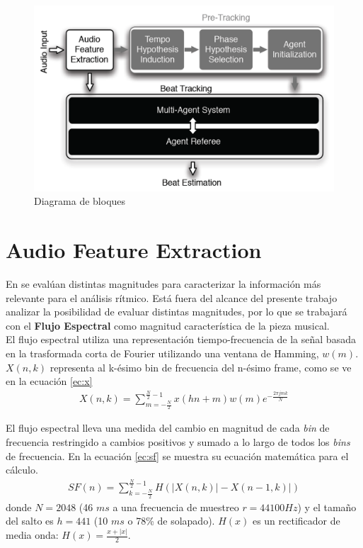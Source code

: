 \documentclass[12pt,a4paper,titlepage]{report}
\begin{document}
\begin{figure}[h!]
\centering
\includegraphics[width=.6\linewidth]{./pics/bloques}
\caption{Diagrama de bloques}
\label{fig:bloques}
\end{figure}

\section{Audio Feature Extraction}
En \cite{bib:feature_extraction} se evalúan distintas magnitudes para caracterizar la información más relevante para el análisis rítmico. Está fuera del alcance del presente trabajo analizar la posibilidad de evaluar distintas magnitudes, por lo que se trabajará con el \textbf{Flujo Espectral} como magnitud característica de la pieza musical.\\

El flujo espectral utiliza una representación tiempo-frecuencia de la señal basada en la trasformada corta de Fourier utilizando una ventana de Hamming, $w(m)$.\\

$X(n,k)$ representa al k-ésimo bin de frecuencia del n-ésimo frame, como se ve en la ecuación \ref{ec:x}
\begin{eqnarray}
X(n,k)=\sum\limits_{m=-\frac{N}{2}}^{\frac{N}{2}-1} x(hn+m)w(m)e^{-\frac{2\pi jmk}{N}}
\label{ec:x}
\end{eqnarray}

El flujo espectral lleva una medida del cambio en magnitud de cada \emph{bin} de frecuencia restringido a cambios positivos y sumado a lo largo de todos los \emph{bins} de frecuencia. En la ecuación \ref{ec:sf} se muestra su ecuación matemática para el cálculo.
\begin{eqnarray}
SF(n)=\sum\limits_{k=-\frac{N}{2}}^{\frac{N}{2}-1} H(|X(n,k)|-X(n-1,k)|)
\label{ec:sf}
\end{eqnarray}
donde $N=2048$ (46 $ms$ a una frecuencia de muestreo $r=44100Hz$) y el tamaño del salto es $h=441$ (10 $ms$ o 78\% de solapado). $H(x)$ es un rectificador de media onda: $H(x)=\frac{x+|x|}{2}$.
\end{document}
